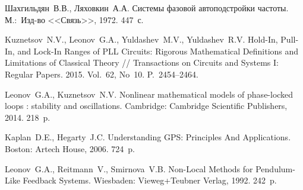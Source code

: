 \documentclass[a4paper,article,14pt]{extarticle}
\begin{document}
\begin{thebibliography}{20}
Шахгильдян~В.\:В., Ляховкин~А.\:А. Системы фазовой автоподстройки частоты. М.:~Изд-во <<Связь>>, 1972. 447~с.

Kuznetsov~N.\:V., Leonov~G.\:A., Yuldashev~M.\:V., Yuldashev~R.\:V. Hold-In, Pull-In, and Lock-In Ranges of PLL Circuits: Rigorous Mathematical Definitions and Limitations of Classical Theory // Transactions on Circuits and Systems I: Regular Papers. 2015. Vol.~62, No~10. P.~2454--2464.
 
Leonov~G.\:A., Kuznetsov~N.\:V. Nonlinear mathematical models of phase-locked loops : stability and oscillations. Cambridge: Cambridge Scientific Publishers, 2014. 218~p.

Kaplan~D.\:E., Hegarty~J.\:C. Understanding GPS: Principles And Applications. Boston: Artech House, 2006. 724~p.

Leonov~G.\:A., Reitmann~V., Smirnova~V.\:B. Non-Local Methods for Pendulum-Like Feedback Systems. Wiesbaden: Vieweg+Teubner Verlag, 1992. 242~p.

\end{thebibliography}
\end{document}
